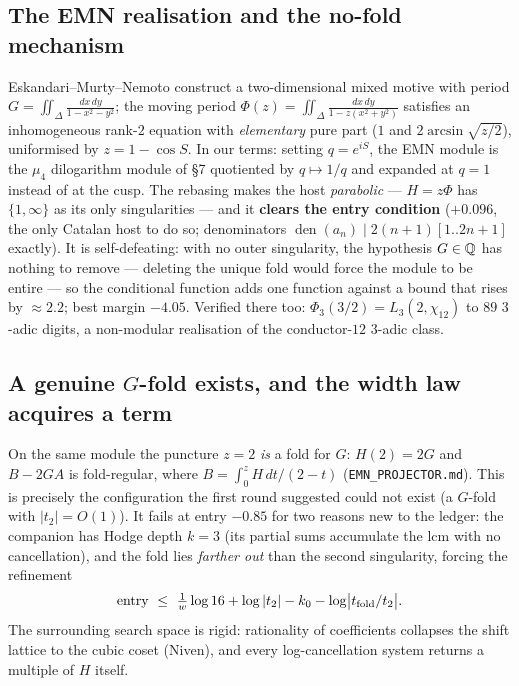 \documentclass[11pt]{amsart}
\theoremstyle{remark}
\begin{document}
\subsection{The EMN realisation and the no-fold mechanism}
Eskandari--Murty--Nemoto \cite{EMN} construct a two-dimensional mixed motive with period $G=\iint_\Delta\frac{dx\,dy}{1-x^2-y^2}$; the moving period $\Phi(z)=\iint_\Delta\frac{dx\,dy}{1-z(x^2+y^2)}$ satisfies an inhomogeneous rank-$2$ equation with \emph{elementary} pure part ($1$ and $2\arcsin\sqrt{z/2}$), uniformised by $z=1-\cos S$. In our terms: setting $q=e^{iS}$, the EMN module is the $\mu_4$ dilogarithm module of \S7 quotiented by $q\mapsto1/q$ and expanded at $q=1$ instead of at the cusp. The rebasing makes the host \emph{parabolic} --- $H=z\Phi$ has $\{1,\infty\}$ as its only singularities --- and it \textbf{clears the entry condition} ($+0.096$, the only Catalan host to do so; denominators $\operatorname{den}(a_n)\mid2(n+1)[1..2n+1]$ exactly). It is self-defeating: with no outer singularity, the hypothesis $G\in\mathbb Q$ has nothing to remove --- deleting the unique fold would force the module to be entire --- so the conditional function adds one function against a bound that rises by $\approx2.2$; best margin $-4.05$. Verified there too: $\Phi_3(3/2)=L_3(2,\chi_{12})$ to $89$ $3$-adic digits, a non-modular realisation of the conductor-$12$ $3$-adic class.

\subsection{A genuine $G$-fold exists, and the width law acquires a term}
On the same module the puncture $z=2$ \emph{is} a fold for $G$: $H(2)=2G$ and $B-2GA$ is fold-regular, where $B=\int_0^zH\,dt/(2-t)$ (\texttt{EMN\_PROJECTOR.md}). This is precisely the configuration the first round suggested could not exist (a $G$-fold with $|t_2|=O(1)$). It fails at entry $-0.85$ for two reasons new to the ledger: the companion has Hodge depth $k=3$ (its partial sums accumulate the lcm with no cancellation), and the fold lies \emph{farther out} than the second singularity, forcing the refinement
\[\mathrm{entry}\ \le\ \tfrac1w\log16+\log|t_2|-k_0-\log\bigl|t_{\rm fold}/t_2\bigr| .\]
The surrounding search space is rigid: rationality of coefficients collapses the shift lattice to the cubic coset (Niven), and every log-cancellation system returns a multiple of $H$ itself.
\end{document}
